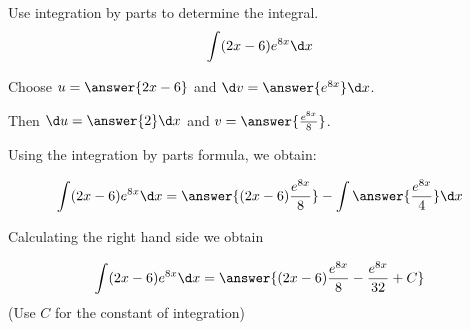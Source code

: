\documentclass{ximera}
\author{Jason Miller}
\begin{document}
\begin{exercise}
Use integration by parts to determine the integral.
\[
\int (2x-6) e^{8x} \d x 
\]


Choose $u=\answer{ 2x-6}$ and $\d v=\answer{e^{8x} } \d x$. 

Then $\d u= \answer{ 2 } \d x$ and $v= \answer{ \frac{e^{8x}}{8} }$.

Using the integration by parts formula, we obtain:

\[
\int (2x-6)e^{8x} \d x= \answer{(2x-6)\frac{e^{8x}}{8}} - \int \answer{ \frac{e^{8x}}{4} } \d x
\]

Calculating the right hand side we obtain

\[
\int (2x-6)e^{8x} \d x= \answer{ (2x-6)\frac{e^{8x}}{8} - \frac{e^{8x}}{32} +C}
\]
(Use $C$ for the constant of integration)

\end{exercise}
\end{document}
